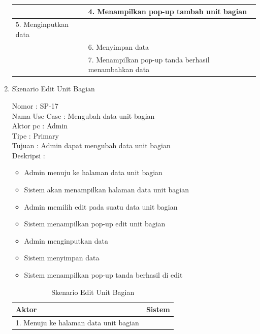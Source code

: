 \begin{enumerate}
\begin{table}
\begin{tabular}{ | p{55mm} | p{70mm} |}
		\hline
		
		& 4.	Menampilkan pop-up tambah unit bagian \\
		
		\hline
		
		5.	Menginputkan data  & \\
		\hline
		
		& 6.	Menyimpan data \\
		\hline
		
		& 7.	Menampilkan pop-up tanda berhasil menambahkan data \\
		\hline
		
	\end{tabular}
\end{table}

\item Skenario Edit Unit Bagian

Nomor \kern 3.6pc : SP-17 \\
Nama Use Case : Mengubah data unit bagian \\
Aktor  pc : Admin \\
Tipe \kern 4.6pc : Primary \\
Tujuan \kern 3.6pc : Admin dapat mengubah data unit bagian \\
Deskripsi \kern 2.5pc : 

\begin{itemize}
	\item Admin menuju ke halaman data unit bagian
	\item Sistem akan menampilkan halaman data unit bagian
	\item Admin memilih edit pada suatu data unit bagian
	\item Sistem menampilkan pop-up edit unit bagian
	\item Admin menginputkan data
	\item Sistem menyimpan data
	\item Sistem menampilkan pop-up tanda berhasil di edit
	
\end{itemize}

\begin{table}
	\caption{Skenario Edit Unit Bagian}
	\centering
	\begin{tabular}{ | p{55mm} | p{70mm} |}
		\hline 
		\textbf{Aktor} & \textbf{Sistem} \\
		\hline
		
		1.	Menuju ke halaman data unit bagian &  \\
		
		\hline
		

\end{tabular}
\end{table}
\end{enumerate}

